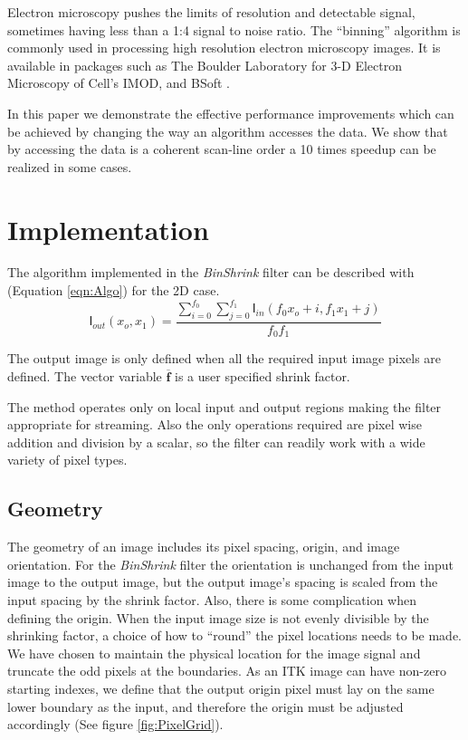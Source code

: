 \documentclass{InsightArticle}
\begin{document}
Electron microscopy  pushes the limits of resolution and detectable
signal, sometimes having less than a 1:4 signal to noise ratio.
The ``binning'' algorithm is commonly used in processing high
resolution electron microscopy images. It is available in packages such
as The Boulder Laboratory for 3-D Electron Microscopy of Cell's
IMOD\cite{IMOD}, and BSoft \cite{bsoft2007}.

In this paper we demonstrate the effective performance improvements which
can be achieved by changing the way an algorithm accesses the data. We
show that by accessing the data is a coherent scan-line order
a 10 times speedup can be realized in some cases.

\section{Implementation}

The algorithm implemented in the \textit{BinShrink} filter can be
described with (Equation \ref{eqn:Algo}) for the 2D case.
\begin{equation}
\label{eqn:Algo}
\mathsf{I}_{out}(x_o,x_1) = \frac{\sum_{i=0}^{f_0}\sum_{j=0}^{f_1}\mathsf{I}_{in}(f_0 x_o+i,f_1 x_1+j)}{f_0 f_1}
\end{equation}

The output image is only defined when all the required input image
pixels are defined. The vector variable $\mathbf{\overline{f}}$ is a user specified
shrink factor.

The method operates only on local input and output regions making the
filter appropriate for streaming. Also the only operations required are
pixel wise addition and division by a scalar, so the filter can readily
work with a wide variety of pixel types.

\subsection{Geometry}

The geometry of an image includes its pixel spacing, origin, and
image orientation. For the \textit{BinShrink} filter the orientation is
unchanged from the input image to the output image, but the output
image's spacing is scaled from the input spacing by the shrink factor.
Also, there is some complication when defining the origin. When the input image size is
not evenly divisible by the shrinking factor, a choice of how to
``round'' the pixel locations needs to be made. We have chosen to maintain the physical
location for the image signal and truncate the odd pixels at the
boundaries. As an ITK image can have non-zero starting indexes, we define
that the output origin pixel must lay on the same lower boundary as the
input, and therefore the origin must be adjusted accordingly (See figure \ref{fig:PixelGrid}).
\end{document}
